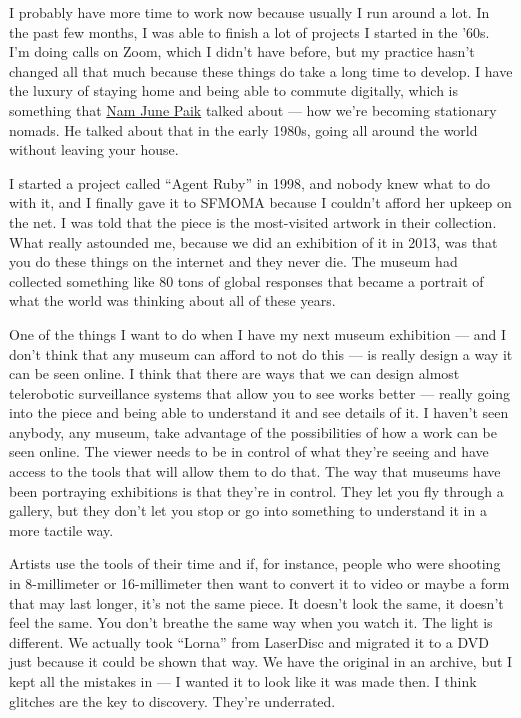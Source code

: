 I probably have more time to work now because usually I run around a
lot. In the past few months, I was able to finish a lot of projects I
started in the '60s. I'm doing calls on Zoom, which I didn't have
before, but my practice hasn't changed all that much because these
things do take a long time to develop. I have the luxury of staying home
and being able to commute digitally, which is something that
\href{https://www.nytimes3xbfgragh.onion/2006/01/31/arts/design/nam-june-paik-73-dies-pioneer-of-video-art-whose-work-broke.html}{Nam
June Paik} talked about --- how we're becoming stationary nomads. He
talked about that in the early 1980s, going all around the world without
leaving your house.

I started a project called ``Agent Ruby'' in 1998, and nobody knew what
to do with it, and I finally gave it to SFMOMA because I couldn't afford
her upkeep on the net. I was told that the piece is the most-visited
artwork in their collection. What really astounded me, because we did an
exhibition of it in 2013, was that you do these things on the internet
and they never die. The museum had collected something like 80 tons of
global responses that became a portrait of what the world was thinking
about all of these years.

One of the things I want to do when I have my next museum exhibition ---
and I don't think that any museum can afford to not do this --- is
really design a way it can be seen online. I think that there are ways
that we can design almost telerobotic surveillance systems that allow
you to see works better --- really going into the piece and being able
to understand it and see details of it. I haven't seen anybody, any
museum, take advantage of the possibilities of how a work can be seen
online. The viewer needs to be in control of what they're seeing and
have access to the tools that will allow them to do that. The way that
museums have been portraying exhibitions is that they're in control.
They let you fly through a gallery, but they don't let you stop or go
into something to understand it in a more tactile way.

Artists use the tools of their time and if, for instance, people who
were shooting in 8-millimeter or 16-millimeter then want to convert it
to video or maybe a form that may last longer, it's not the same piece.
It doesn't look the same, it doesn't feel the same. You don't breathe
the same way when you watch it. The light is different. We actually took
``Lorna'' from LaserDisc and migrated it to a DVD just because it could
be shown that way. We have the original in an archive, but I kept all
the mistakes in --- I wanted it to look like it was made then. I think
glitches are the key to discovery. They're underrated.

